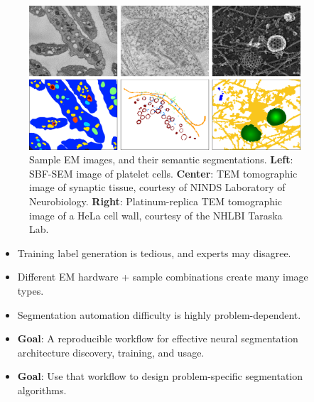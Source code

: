 \documentclass[final]{beamer}
\newlength{\sepwid}
\newlength{\onecolwid}
\renewcommand{\emph}[1]{{\color{nibib2} #1}}
\begin{document}
\begin{frame}[t]
\begin{columns}[t]
\begin{column}{\onecolwid}
\begin{center}
\begin{figure}
\includegraphics[width=\linewidth]{fig/segmentationintroshort.png}
\caption{Sample EM images, and their semantic segmentations. \textbf{Left}: SBF-SEM image of platelet cells. \textbf{Center}: TEM tomographic image of synaptic tissue, courtesy of NINDS Laboratory of Neurobiology. \textbf{Right}: Platinum-replica TEM tomographic image of a HeLa cell wall, courtesy of the NHLBI Taraska Lab.}
\end{figure}
\end{center}

\begin{tcolorbox}[title=Segmentation Challenges]
\begin{itemize}
\item Training \emph{label generation} is tedious, and experts may disagree.
\item Different EM hardware + sample combinations create \emph{many image types}.
\item Segmentation automation difficulty is highly \emph{problem-dependent}.
\item \textbf{Goal}: A \emph{reproducible workflow} for effective neural segmentation architecture discovery, training, and usage.
\item \textbf{Goal}: Use that workflow to design \emph{problem-specific segmentation algorithms}.
\end{itemize}
\end{tcolorbox}

\end{column} 


\begin{column}{\sepwid}\end{column} %


\begin{column}{\onecolwid}


\end{column}
\end{columns}
\end{frame}
\end{document}
